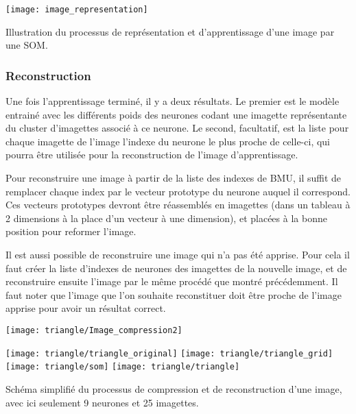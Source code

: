 	\begin{figureth}
		\texttt{[image: image\_representation]}
		\caption[Représentation d'une image]{Illustration du processus de représentation et d'apprentissage d'une image par une SOM.}\label{fig:img:rep}
	\end{figureth}

	\subsubsection{Reconstruction}

	Une fois l'apprentissage terminé, il y a deux résultats. Le premier est le modèle entrainé avec les différents poids des neurones codant une imagette représentante du cluster d'imagettes associé à ce neurone. Le second, facultatif, est la liste pour chaque imagette de l'image l'indexe du neurone le plus proche de celle-ci, qui pourra être utilisée pour la reconstruction de l'image d'apprentissage.  

	Pour reconstruire une image à partir de la liste des indexes de BMU, il suffit de remplacer chaque index par le vecteur prototype du neurone auquel il correspond. Ces vecteurs prototypes devront être réassemblés en imagettes (dans un tableau à 2 dimensions à la place d'un vecteur à une dimension), et placées à la bonne position pour reformer l'image.

	Il est aussi possible de reconstruire une image qui n'a pas été apprise. Pour cela il faut créer la liste d'indexes de neurones des imagettes de la nouvelle image, et de reconstruire ensuite l'image par le même procédé que montré précédemment. Il faut noter que l'image que l'on souhaite reconstituer doit être proche de l'image apprise pour avoir un résultat correct.

	\begin{figureth}
		\begin{subfigureth}{\textwidth}
			\texttt{[image: triangle/Image\_compression2]}
		\end{subfigureth}
		\begin{subfigureth}{\textwidth}
			\texttt{[image: triangle/triangle\_original]}\hfill
			\texttt{[image: triangle/triangle\_grid]}\hfill
			\texttt{[image: triangle/som]}\hfill
			\texttt{[image: triangle/triangle]}
		\end{subfigureth}
		\caption[Compression et décompression d'image]{Schéma simplifié du processus de compression et de reconstruction d'une image, avec ici seulement 9 neurones et 25 imagettes.}\label{fig:img:comp_ex}
	\end{figureth}

